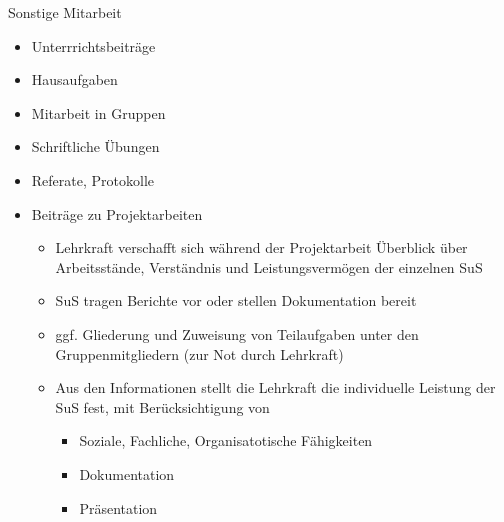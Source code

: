 \documentclass{article}
\begin{document}
\begin{block}{Sonstige Mitarbeit}
    \begin{itemize}
        \item Unterrrichtsbeiträge
        \item Hausaufgaben
        \item Mitarbeit in Gruppen
        \item Schriftliche Übungen
        \item Referate, Protokolle
        \item Beiträge zu Projektarbeiten
        \begin{itemize}
            \item Lehrkraft verschafft sich während der Projektarbeit Überblick über Arbeitsstände, Verständnis und Leistungsvermögen der einzelnen SuS
            \item SuS tragen Berichte vor oder stellen Dokumentation bereit
            \item ggf. Gliederung und Zuweisung von Teilaufgaben unter den Gruppenmitgliedern (zur Not durch Lehrkraft)
            \item Aus den Informationen stellt die Lehrkraft die individuelle Leistung der SuS fest, mit Berücksichtigung von
            \begin{itemize}
                \item Soziale, Fachliche, Organisatotische Fähigkeiten
                \item Dokumentation
                \item Präsentation
            \end{itemize}
        \end{itemize}
    \end{itemize}
\end{block}
\end{document}
